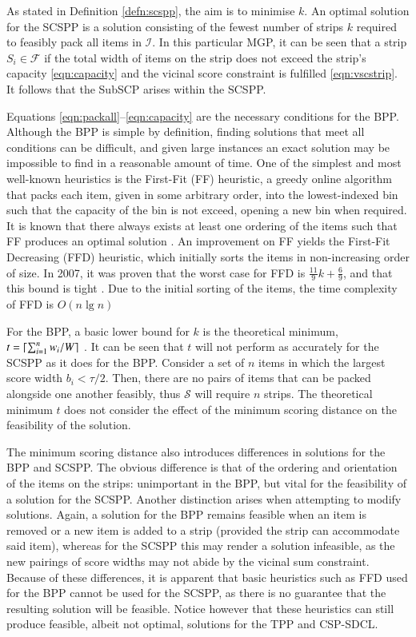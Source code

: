 \documentclass{elsarticle}
\begin{document}
\noindent As stated in Definition \ref{defn:scspp}, the aim is to minimise $k$. An optimal solution for the SCSPP is a solution consisting of the fewest number of strips $k$ required to feasibly pack all items in $\mathcal{I}$. In this particular MGP, it can be seen that a strip $S_i \in \mathcal{F}$ if the total width of items on the strip does not exceed the strip's capacity \eqref{eqn:capacity} and the vicinal score constraint is fulfilled \eqref{eqn:vscstrip}. It follows that the SubSCP arises within the SCSPP.

Equations \eqref{eqn:packall}--\eqref{eqn:capacity} are the necessary conditions for the BPP. Although the BPP is simple by definition, finding solutions that meet all conditions can be difficult, and given large instances an exact solution may be impossible to find in a reasonable amount of time. One of the simplest and most well-known heuristics is the First-Fit (FF) heuristic, a greedy online algorithm that packs each item, given in some arbitrary order, into the lowest-indexed bin such that the capacity of the bin is not exceed, opening a new bin when required. It is known that there always exists at least one ordering of the items such that FF produces an optimal solution \cite{lewis2009}. An improvement on FF yields the First-Fit Decreasing (FFD) heuristic, which initially sorts the items in non-increasing order of size. In 2007, it was proven that the worst case for FFD is $\frac{11}{9}k + \frac{6}{9}$, and that this bound is tight \cite{dosa2007}. Due to the initial sorting of the items, the time complexity of FFD is $O(n \lg n)$

For the BPP, a basic lower bound for $k$ is the theoretical minimum, $t = \lceil\sum_{i=1}^{n} w_i / W\rceil$ \cite{martello1990l}. It can be seen that $t$ will not perform as accurately for the SCSPP as it does for the BPP. Consider a set of $n$ items in which the largest score width $b_i < \tau/2$. Then, there are no pairs of items that can be packed alongside one another feasibly, thus $\mathcal{S}$ will require $n$ strips. The theoretical minimum $t$ does not consider the effect of the minimum scoring distance on the feasibility of the solution. 

The minimum scoring distance also introduces differences in solutions for the BPP and SCSPP. The obvious difference is that of the ordering and orientation of the items on the strips: unimportant in the BPP, but vital for the feasibility of a solution for the SCSPP. Another distinction arises when attempting to modify solutions. Again, a solution for the BPP remains feasible when an item is removed or a new item is added to a strip (provided the strip can accommodate said item), whereas for the SCSPP this may render a solution infeasible, as the new pairings of score widths may not abide by the vicinal sum constraint. Because of these differences, it is apparent that basic heuristics such as FFD used for the BPP cannot be used for the SCSPP, as there is no guarantee that the resulting solution will be feasible. Notice however that these heuristics can still produce feasible, albeit not optimal, solutions for the TPP and CSP-SDCL.
\end{document}
